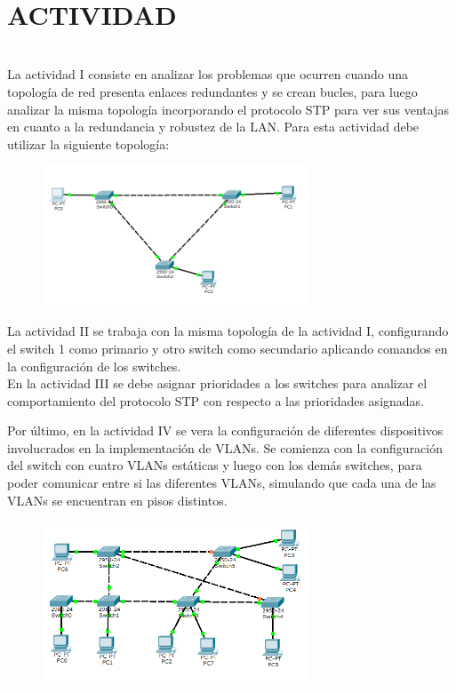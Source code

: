 \documentclass[onecolumn,12pt]{IEEEtran}
\begin{document}
\hfill \\
\section{ACTIVIDAD}
\hfill \\

La actividad I consiste en analizar los problemas que ocurren cuando una topología de red presenta enlaces redundantes y se crean bucles, para luego analizar la misma topología incorporando el protocolo STP para ver sus ventajas en cuanto a la redundancia y robustez de la LAN. Para esta actividad debe utilizar la siguiente topología:

\begin{figure}[!h]
\centering
\includegraphics[width=0.7\textwidth]{top1.PNG}
\label{fig:mesh1}
\end{figure}

La actividad II se trabaja con la misma topología de la actividad I, configurando el switch 1 como primario y otro switch como secundario aplicando comandos en la configuración de los switches.\\

En la actividad III se debe asignar prioridades a los switches para analizar el comportamiento del protocolo STP con respecto a las prioridades asignadas.\\

\newpage

Por último, en la actividad IV se vera la configuración de diferentes dispositivos involucrados en la implementación de VLANs. Se comienza con la configuración del switch con cuatro VLANs estáticas y luego con los demás switches, para poder comunicar entre si las diferentes VLANs, simulando que cada una de las VLANs se encuentran en pisos distintos.

\begin{figure}[!h]
\centering
\includegraphics[width=0.7\textwidth]{top2.PNG}
\label{fig:mesh1}
\end{figure}
\end{document}
